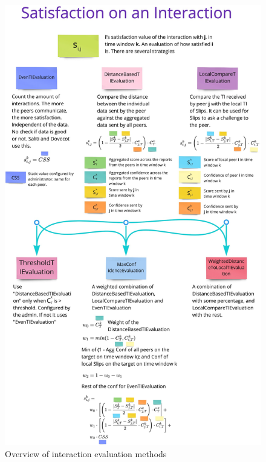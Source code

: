 \begin{figure}
    \centering
    \includegraphics[height=0.95\textheight]{assets/interaction_evaluation.jpeg}
    \caption{Overview of interaction evaluation methods}
    \label{fig:overview-of-interaction-evaluation-methods}
\end{figure}